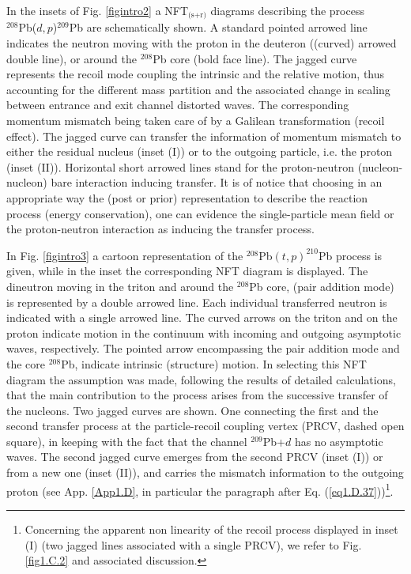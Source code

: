 In the insets of Fig. \ref{figintro2} a NFT$_{\text{(s+r)}}$  diagrams describing the process\\ \mbox{$^{208}$Pb($d,p$)$^{209}$Pb} are schematically shown. A standard pointed arrowed line indicates the neutron moving with the proton in the deuteron ((curved) arrowed double line), or around the  $^{208}$Pb core (bold face line). The jagged curve represents the recoil  mode coupling the intrinsic and the relative motion,  thus accounting for the different mass partition  and the associated change in scaling between entrance and exit channel distorted waves. The corresponding momentum mismatch being taken care of by a  Galilean transformation (recoil effect). The jagged curve can transfer the information of momentum mismatch to either the residual nucleus (inset (I)) or to the outgoing particle, i.e. the proton (inset (II)).  Horizontal short arrowed lines stand for the proton-neutron (nucleon-nucleon) bare interaction inducing transfer. It is of notice that choosing in an appropriate way the (post or prior) representation to describe the reaction process (energy conservation), one can evidence the single-particle mean field or the proton-neutron interaction as inducing the transfer process.


In Fig. \ref{figintro3} a cartoon  representation of the $^{208}$Pb$(t,p)^{210}$Pb process is given, while in the inset the corresponding NFT diagram is displayed.  The dineutron  moving in the triton and around the $^{208}$Pb core, (pair addition mode) is represented by a double arrowed line. Each individual transferred neutron is indicated with a single arrowed line. The curved arrows on the triton and on the proton indicate motion in the continuum with   incoming and outgoing asymptotic waves, respectively. The pointed arrow encompassing the pair addition mode and the core $^{208}$Pb, indicate intrinsic (structure) motion. In selecting this NFT diagram  the assumption was made, following the results of detailed calculations, that the main contribution to the process arises from the successive transfer of the nucleons. Two jagged curves are shown. One connecting the first and the second transfer process at the particle-recoil  coupling vertex (PRCV, dashed open square), in keeping with the fact that the channel $^{209}$Pb+$d$ has no asymptotic waves. The second jagged curve emerges from the second PRCV (inset (I)) or from a new  one (inset (II)), and carries the mismatch information to  the outgoing proton   (see App. \ref{App1.D}, in particular the  paragraph after Eq. (\ref{eq1.D.37}))\footnote{Concerning the apparent non linearity of the recoil process displayed in inset (I) (two jagged lines associated with a single PRCV), we refer to Fig. \ref{fig1.C.2} and associated discussion.}. 

